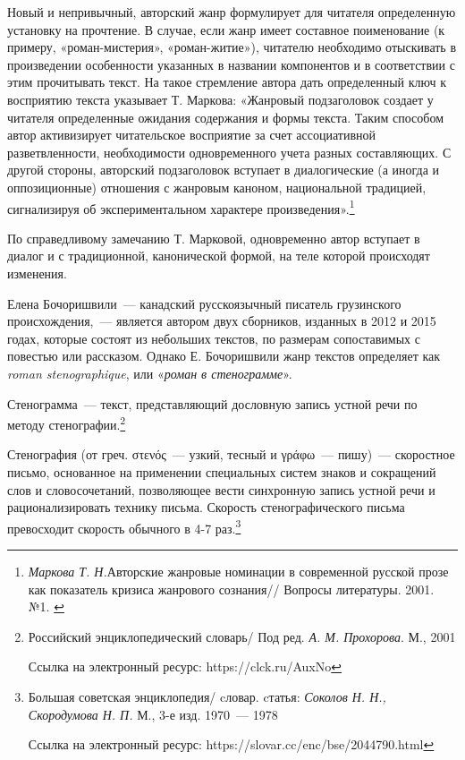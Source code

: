 \documentclass{kursa4}
\begin{document}
    Новый и непривычный, авторский жанр формулирует для читателя
    определенную установку на прочтение. В случае, если жанр имеет
    составное поименование (к примеру, «роман-мистерия», «роман-житие»),
    читателю необходимо отыскивать в произведении особенности указанных в
    названии компонентов и в соответствии с этим прочитывать текст. На
    такое стремление автора дать определенный ключ к восприятию текста
    указывает Т. Маркова:\newline
    «Жанровый подзаголовок создает у читателя определенные ожидания
    содержания и формы текста. Таким способом автор активизирует
    читательское восприятие за счет ассоциативной разветвленности,
    необходимости одновременного учета разных составляющих. С другой
    стороны, авторский подзаголовок вступает в диалогические (а иногда и
    оппозиционные) отношения с жанровым каноном, национальной традицией,
    сигнализируя об экспериментальном характере
    произведения».\footnote{{
    }\textit{{Маркова Т. Н.}}{Авторские
    жанровые номинации в современной русской прозе как показатель кризиса
    жанрового сознания// Вопросы литературы. 2001. №1. }}

    По справедливому замечанию Т. Марковой, одновременно автор вступает
    в диалог и с традиционной, канонической формой, на теле которой
    происходят изменения. 

    Елена Бочоришвили~--- канадский русскоязычный писатель грузинского
    происхождения,~--- является автором двух сборников, изданных в 2012 и
    2015 годах, которые состоят из небольших текстов, по размерам
    сопоставимых с повестью или рассказом. Однако Е. Бочоришвили жанр
    текстов определяет как \textit{roman stenographique}, или
    «\textit{роман в стенограмме}». 

    {Стенограмма~--- текст, представляющий дословную
    запись устной речи по методу
    стенографии.}\footnote{{Российский энциклопедический
    словарь/ Под ред. \textit{А. М. Прохорова}. М., 2001 }\par
    {Ссылка на электронный ресурс:
    https://clck.ru/AuxNo}}

    {Стенография}\textbf{{ }}(от греч.
    στενός~--- узкий, тесный и γράφω~--- пишу)~--- скоростное письмо, основанное
    на применении специальных систем знаков и сокращений слов и
    словосочетаний, позволяющее вести синхронную запись устной речи и
    рационализировать технику письма. Скорость стенографического письма
    превосходит скорость обычного в 4-7
    раз.\footnote{{Большая советская энциклопедия/ cловар. cтатья: \textit{Соколов Н. Н., Скородумова Н. П.} М., 3-е изд. 1970~--- 1978}\par{Ссылка на электронный ресурс: https://slovar.cc/enc/bse/2044790.html}}
\end{document}
